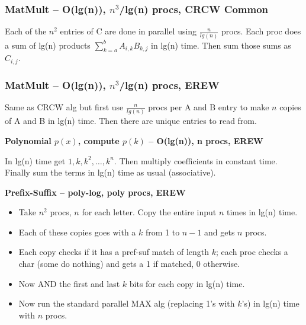 \documentclass[12pt]{article}
\providecommand{\tightlist}{
    \setlength{\itemsep}{0pt}\setlength{\parskip}{0pt}
}
\begin{document}
\subsubsection*{MatMult -- O(lg(n)), $n^3$/lg(n) procs, CRCW Common}
Each of the $n^2$ entries of C are done in parallel using $\frac{n}{lg(n)}$ procs.
Each proc does a sum of lg(n) products $\sum_{k=a}^b A_{i,k}B_{k,j}$ in lg(n) time.
Then sum those sums as $C_{i,j}$.
\subsubsection*{MatMult -- O(lg(n)), $n^3$/lg(n) procs, EREW}
Same as CRCW alg but first use $\frac{n}{lg(n)}$ procs per A and B entry to make $n$ copies of A and B in lg(n) time.
Then there are unique entries to read from.



\begin{centering}\textbf{Polynomial $p(x)$, compute $p(k)$ -- O(lg(n)), n procs, EREW}\par\end{centering}
In lg(n) time get $1,k,k^2,\dots ,k^n$. Then multiply coefficients in constant time.
Finally sum the terms in lg(n) time as usual (associative).


\begin{centering}\textbf{Prefix-Suffix -- poly-log, poly procs, EREW}\par\end{centering}
\begin{itemize}\tightlist
  \item Take $n^2$ procs, $n$ for each letter. Copy the entire input $n$ times in lg(n) time.
  \item Each of these copies goes with a $k$ from 1 to $n-1$ and gets $n$ procs.
  \item Each copy checks if it has a pref-suf match of length $k$; each proc checks a char (some do nothing) and gets a 1 if matched, 0 otherwise.
  \item Now AND the first and last $k$ bits for each copy in lg(n) time.
  \item Now run the standard parallel MAX alg (replacing 1's with $k$'s) in lg(n) time with $n$ procs.
\end{itemize}
\end{document}
